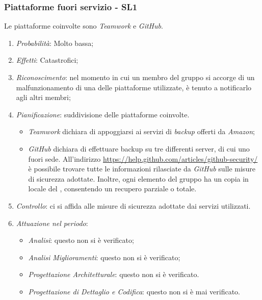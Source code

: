 \subsubsection{Piattaforme fuori servizio - SL1}
Le piattaforme coinvolte sono \textit{Teamwork} e \textit{GitHub}.
\begin{enumerate}
\item \textit{Probabilit\`a}: Molto bassa;
\item \textit{Effetti}: Catastrofici;
\item \textit{Riconoscimento}: nel momento in cui un membro del gruppo si accorge di un malfunzionamento di una delle piattaforme utilizzate, è tenuto a notificarlo agli altri membri;
\item \textit{Pianificazione}: suddivisione delle piattaforme coinvolte.
  \begin{itemize}
    \item \textit{Teamwork} dichiara di appoggiarsi ai servizi di \textit{backup} offerti da \textit{Amazon};
    \item \textit{GitHub} dichiara di effettuare backup su tre differenti server, di cui uno fuori sede. All'indirizzo \href{https://help.github.com/articles/github-security/}{https://help.github.com/articles/github-security/} \`e possibile trovare tutte le informazioni rilasciate da \textit{GitHub} sulle misure di sicurezza adottate. Inoltre, ogni elemento del gruppo ha un copia in locale del , consentendo un recupero parziale o totale.
  \end{itemize}
\item \textit{Controllo}: ci si affida alle misure di sicurezza adottate dai servizi utilizzati.
\item \textit{Attuazione nel periodo}: 
	\begin{itemize}
	\item \textit{Analisi}: questo  non si è verificato;
	\item \textit{Analisi Miglioramenti}: questo  non si è verificato;
	\item \textit{Progettazione Architetturale}: questo  non si è verificato.
	\item \textit{Progettazione di Dettaglio e Codifica}: questo  non si è mai verificato.
	\end{itemize}
\end{enumerate}

